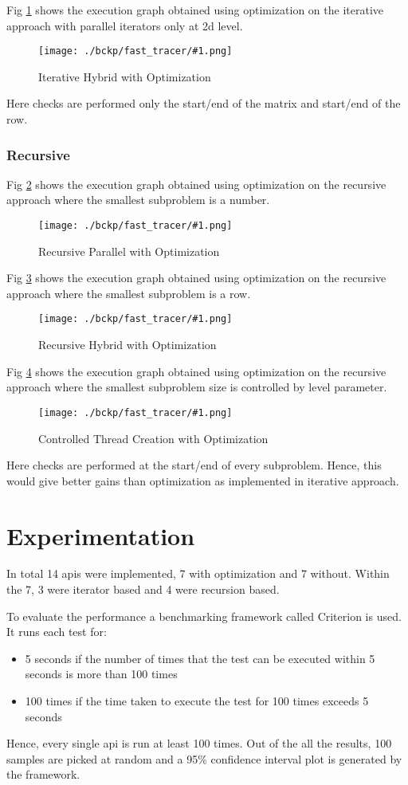 \documentclass{article}
\newcommand{\loadFig}[2]{{%
\begin{figure}[!ht]
    \texttt{[image: ./bckp/fast\_tracer/\#1.png]}
    \caption{#2}
    \label{#1}
\end{figure}}
}%
\begin{document}
Fig \ref{iter_hyb_2d_opti} shows the execution graph obtained using optimization on the iterative approach with parallel iterators only at 2d level.

\loadFig{iter_hyb_2d_opti}{Iterative Hybrid with Optimization}

Here checks are performed only the start/end of the matrix and start/end of the row.

\subsubsection{Recursive}

Fig \ref{recur_par_2d_opti} shows the execution graph obtained using optimization on the recursive approach where the smallest subproblem is a number.

\loadFig{recur_par_2d_opti}{Recursive Parallel with Optimization}

Fig \ref{recur_hyb_2d_opti} shows the execution graph obtained using optimization on the recursive approach where the smallest subproblem is a row.

\loadFig{recur_hyb_2d_opti}{Recursive Hybrid with Optimization}

Fig \ref{recur_cwd_2d_opti} shows the execution graph obtained using optimization on the recursive approach where the smallest subproblem size is controlled by level parameter.

\loadFig{recur_cwd_2d_opti}{Controlled Thread Creation with Optimization}

Here checks are performed at the start/end of every subproblem.
Hence, this would give better gains than optimization as implemented in iterative approach.

\section{Experimentation}
In total 14 apis were implemented, 7 with optimization and 7 without.
Within the 7, 3 were iterator based and 4 were recursion based.

To evaluate the performance a benchmarking framework called Criterion\cite{criterion} is used.
It runs each test for:
\begin{itemize}
    \item 5 seconds if the number of times that the test can be executed within 5 seconds is more than 100 times
    \item 100 times if the time taken to execute the test for 100 times exceeds 5 seconds
\end{itemize}
Hence, every single api is run at least 100 times.
Out of the all the results, 100 samples are picked at random and a 95\% confidence interval plot is generated by the framework.
\end{document}
